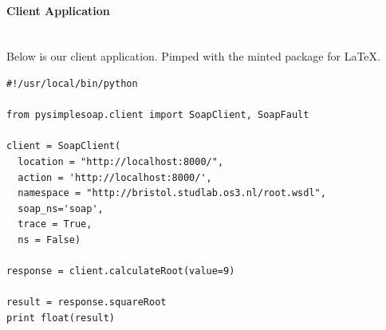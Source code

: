 \paragraph{Client Application}\mbox{}\\
Below is our client application. Pimped with the minted package for \LaTeX.

\begin{verbatim}
#!/usr/local/bin/python
 
from pysimplesoap.client import SoapClient, SoapFault
 
client = SoapClient(
  location = "http://localhost:8000/",
  action = 'http://localhost:8000/',
  namespace = "http://bristol.studlab.os3.nl/root.wsdl", 
  soap_ns='soap',
  trace = True,
  ns = False)
 
response = client.calculateRoot(value=9)
 
result = response.squareRoot
print float(result)
\end{verbatim}

